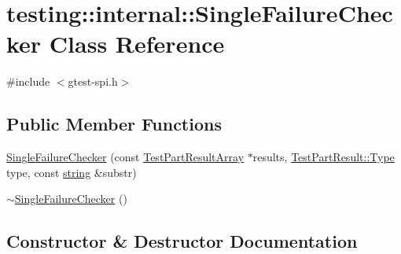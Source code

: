 \hypertarget{classtesting_1_1internal_1_1_single_failure_checker}{}\section{testing\+:\+:internal\+:\+:Single\+Failure\+Checker Class Reference}
\label{classtesting_1_1internal_1_1_single_failure_checker}


{\ttfamily \#include $<$gtest-\/spi.\+h$>$}

\subsection*{Public Member Functions}
\begin{DoxyCompactItemize}
\item 
\hyperlink{classtesting_1_1internal_1_1_single_failure_checker_a6d350d385526c97c9982e928f5f8fb56}{Single\+Failure\+Checker} (const \hyperlink{classtesting_1_1_test_part_result_array}{Test\+Part\+Result\+Array} $\ast$results, \hyperlink{classtesting_1_1_test_part_result_a65ae656b33fdfdfffaf34858778a52d5}{Test\+Part\+Result\+::\+Type} type, const \hyperlink{namespacetesting_1_1internal_a8e8ff5b11e64078831112677156cb111}{string} \&substr)
\item 
\hyperlink{classtesting_1_1internal_1_1_single_failure_checker_a4b0a907c9c1b350c79d70af138e9f0bf}{$\sim$\+Single\+Failure\+Checker} ()
\end{DoxyCompactItemize}


\subsection{Constructor \& Destructor Documentation}
